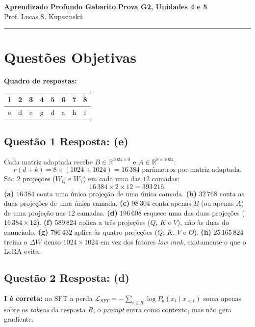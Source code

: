 \documentclass[11pt,a4paper]{article}
\begin{document}
{\Large\bfseries Aprendizado Profundo \textemdash{} Gabarito} \hfill \textbf{Prova G2, Unidades 4 e 5}\\
Prof. Lucas S. Kupssinskü

\rule{\linewidth}{0.8pt}

\section*{Questões Objetivas}

\textbf{Quadro de respostas:}
\begin{center}
\begin{tabular}{|c|c|c|c|c|c|c|c|}
\hline
1 & 2 & 3 & 4 & 5 & 6 & 7 & 8 \\\hline
e & d & c & g & d & a & h & f \\\hline
\end{tabular}
\end{center}

\color{blue}

\subsection*{Questão 1 \textemdash{} Resposta: (e)}
Cada matriz adaptada recebe $B \in \mathbb{R}^{1024 \times 8}$ e $A \in \mathbb{R}^{8 \times 1024}$:
\[
r(d + k) = 8 \times (1024 + 1024) = 16\,384 \text{ parâmetros por matriz adaptada}.
\]
São $2$ projeções ($W_Q$ e $W_V$) em cada uma das $12$ camadas:
\[
16\,384 \times 2 \times 12 = 393\,216.
\]
\textbf{(a)} $16\,384$ conta uma única projeção de uma única camada.
\textbf{(b)} $32\,768$ conta as duas projeções de uma única camada.
\textbf{(c)} $98\,304$ conta apenas $B$ (ou apenas $A$) de uma projeção nas $12$ camadas.
\textbf{(d)} $196\,608$ esquece uma das duas projeções ($16\,384 \times 12$).
\textbf{(f)} $589\,824$ aplica a três projeções ($Q$, $K$ e $V$), não às duas do enunciado.
\textbf{(g)} $786\,432$ aplica às quatro projeções ($Q$, $K$, $V$ e $O$).
\textbf{(h)} $25\,165\,824$ treina o $\Delta W$ denso $1024 \times 1024$ em vez dos fatores \textit{low rank}, exatamente o que o LoRA evita.

\subsection*{Questão 2 \textemdash{} Resposta: (d)}
\textbf{I é correta:} no SFT a perda $\mathcal{L}_{SFT} = -\sum_{t \in R} \log P_\theta(x_t \mid x_{<t})$ soma apenas sobre os \textit{tokens} da resposta $R$; o \textit{prompt} entra como contexto, mas não gera gradiente.
\end{document}
